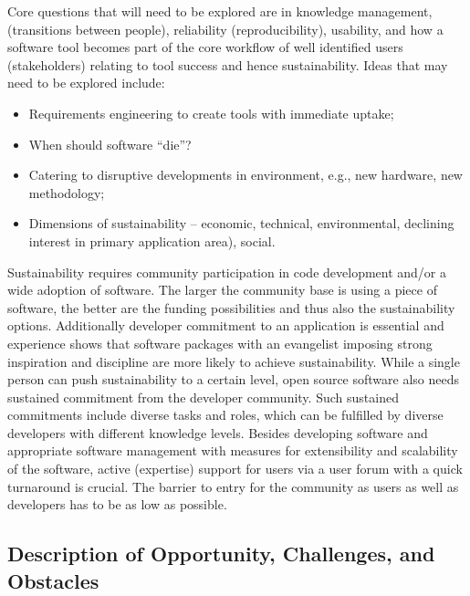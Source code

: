 Core questions that will need to be explored are in knowledge management, 
(transitions between people), reliability (reproducibility), usability, and how a software tool becomes part of the core workflow of well identified users (stakeholders)
relating to tool success and hence sustainability.  Ideas 
that may need to be explored include:
\begin{itemize}

\item Requirements engineering to create tools with immediate uptake;

\item When should software ``die''?

\item Catering to disruptive developments in environment, e.g., new hardware,
new methodology;

\item Dimensions of sustainability -- economic, technical, environmental,
declining interest in primary application area),  social.

\end{itemize}

Sustainability requires community participation in code development and/or a
wide adoption of software. The larger the community base is using a piece of
software, the better are the funding possibilities and thus also the
sustainability options. Additionally developer commitment to an application is
essential and experience shows that software packages with an evangelist
imposing strong inspiration and discipline are more likely to achieve
sustainability. While a single person can push sustainability to a certain
level, open source software also needs sustained commitment from the developer
community. Such sustained commitments include diverse tasks and roles, which can
be fulfilled by diverse developers with different knowledge levels. Besides
developing software and appropriate software management with measures for
extensibility and scalability of the software, active (expertise) support for
users via a user forum with a quick turnaround is crucial. The barrier to entry
for the community as users as well as developers has to be as low as possible.

\subsection{Description of Opportunity, Challenges, and Obstacles}

